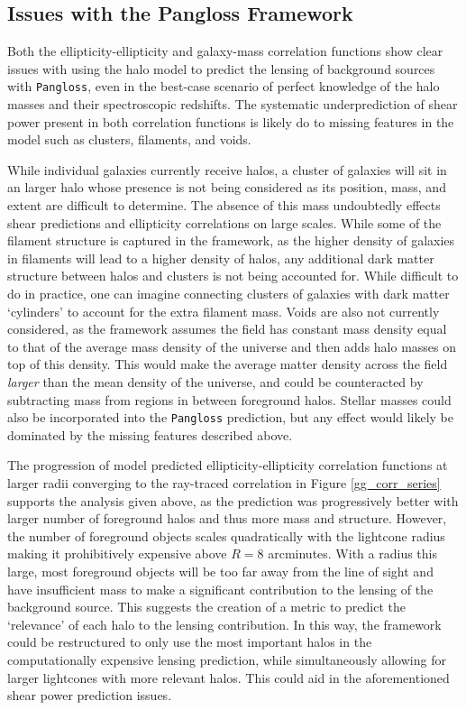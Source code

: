 \documentclass[%
 reprint,
 amsmath,amssymb,
 aps,nofootinbib
]{revtex4-1}
\begin{document}
\subsection*{Issues with the Pangloss Framework}

Both the ellipticity-ellipticity and galaxy-mass correlation functions show clear issues with using the halo model to predict the lensing of background sources with \texttt{Pangloss}, even in the best-case scenario of perfect knowledge of the halo masses and their spectroscopic redshifts. The systematic underprediction of shear power present in both correlation functions is likely do to missing features in the model such as clusters, filaments, and voids. 

While individual galaxies currently receive halos, a cluster of galaxies will sit in an larger halo whose presence is not being considered as its position, mass, and extent are difficult to determine. The absence of this mass undoubtedly effects shear predictions and ellipticity correlations on large scales. While some of the filament structure is captured in the framework, as the higher density of galaxies in filaments will lead to a higher density of halos, any additional dark matter structure between halos and clusters is not being accounted for. While difficult to do in practice, one can imagine connecting clusters of galaxies with dark matter `cylinders' to account for the extra filament mass. Voids are also not currently considered, as the framework assumes the field has constant mass density equal to that of the average mass density of the universe and then adds halo masses on top of this density. This would make the average matter density across the field \textit{larger} than the mean density of the universe, and could be counteracted by subtracting mass from regions in between foreground halos. Stellar masses could also be incorporated into the \texttt{Pangloss} prediction, but any effect would likely be dominated by the missing features described above.

The progression of model predicted ellipticity-ellipticity correlation functions at larger radii converging to the ray-traced correlation in Figure \ref{gg_corr_series} supports the analysis given above, as the prediction was progressively better with larger number of foreground halos and thus more mass and structure. However, the number of foreground objects scales quadratically with the lightcone radius making it prohibitively expensive above $R=8$ arcminutes. With a radius this large, most foreground objects will be too far away from the line of sight and have insufficient mass to make a significant contribution to the lensing of the background source. This suggests the creation of a metric to predict the `relevance' of each halo to the lensing contribution. In this way, the framework could be restructured to only use the most important halos in the computationally expensive lensing prediction, while simultaneously allowing for larger lightcones with more relevant halos. This could aid in the aforementioned shear power prediction issues.  
\end{document}
